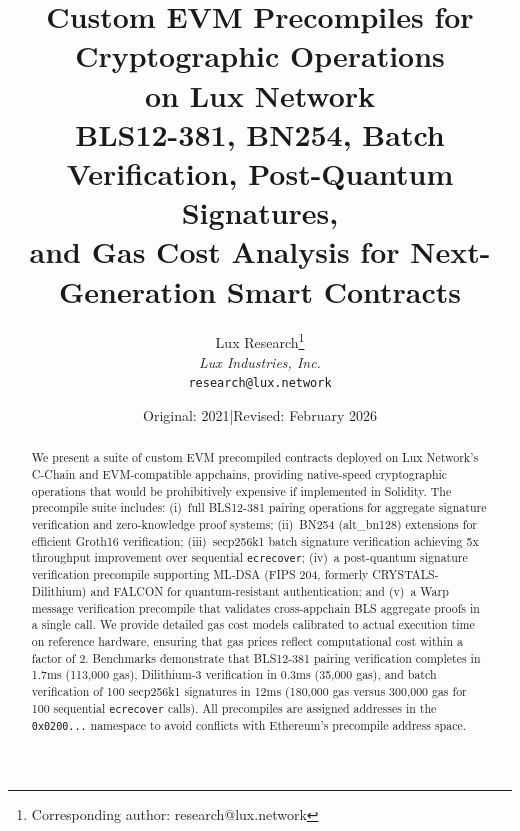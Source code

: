 \documentclass[11pt,a4paper]{article}
\title{\textbf{Custom EVM Precompiles for Cryptographic Operations\\on Lux Network}\\[6pt]
\large BLS12-381, BN254, Batch Verification, Post-Quantum Signatures,\\and Gas Cost Analysis for Next-Generation Smart Contracts}
\author{
Lux Research\thanks{Corresponding author: research@lux.network}\\
\textit{Lux Industries, Inc.}\\
\texttt{research@lux.network}
}
\date{Original: 2021\quad|\quad Revised: February 2026}
\begin{document}
\luxcoverpage

\begin{abstract}
We present a suite of custom EVM precompiled contracts deployed on Lux Network's C-Chain and EVM-compatible appchains, providing native-speed cryptographic operations that would be prohibitively expensive if implemented in Solidity. The precompile suite includes: (i)~full BLS12-381 pairing operations for aggregate signature verification and zero-knowledge proof systems; (ii)~BN254 (alt\_bn128) extensions for efficient Groth16 verification; (iii)~secp256k1 batch signature verification achieving 5x throughput improvement over sequential \texttt{ecrecover}; (iv)~a post-quantum signature verification precompile supporting ML-DSA (FIPS 204, formerly CRYSTALS-Dilithium) and FALCON for quantum-resistant authentication; and (v)~a Warp message verification precompile that validates cross-appchain BLS aggregate proofs in a single call. We provide detailed gas cost models calibrated to actual execution time on reference hardware, ensuring that gas prices reflect computational cost within a factor of 2. Benchmarks demonstrate that BLS12-381 pairing verification completes in 1.7ms (113,000 gas), Dilithium-3 verification in 0.3ms (35,000 gas), and batch verification of 100 secp256k1 signatures in 12ms (180,000 gas versus 300,000 gas for 100 sequential \texttt{ecrecover} calls). All precompiles are assigned addresses in the \texttt{0x0200...} namespace to avoid conflicts with Ethereum's precompile address space.
\end{abstract}















\end{document}
